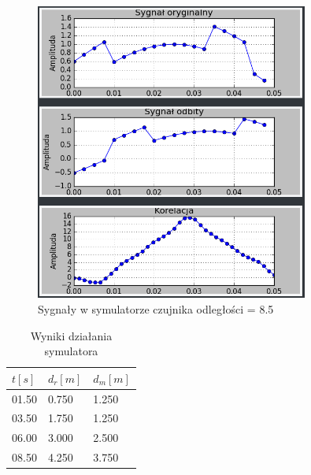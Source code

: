 \documentclass{article}
\begin{document}
{{            \begin{figure}[h!]
                \centering
                \includegraphics[width=0.8\textwidth]{img/sim16.png}
                \caption{Sygnały w symulatorze czujnika odległości = 8.5}
            \end{figure}
            \FloatBarrier
            \begin{table}[h!]
                \centering
                \begin{tabular}{|l|l|l|}
                    \hline
                    $t[s]$ & $d_r[m]$ & $d_m[m]$ \\ \hline
                    01.50  & 0.750    & 1.250    \\ \hline
                    03.50  & 1.750    & 1.250    \\ \hline
                    06.00  & 3.000    & 2.500    \\ \hline
                    08.50  & 4.250    & 3.750    \\ \hline
                \end{tabular}
                \caption{Wyniki działania symulatora}
            \end{table}
        }
        \newpage

}
\end{document}
